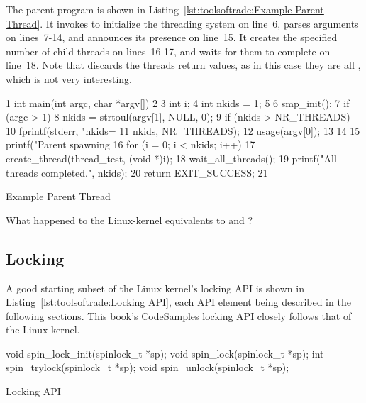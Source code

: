 The parent program is shown in
Listing~\ref{lst:toolsoftrade:Example Parent Thread}.
It invokes  to initialize the threading system on
line~6,
parses arguments on lines~7-14, and announces its presence on line~15.
It creates the specified number of child threads on lines~16-17,
and waits for them to complete on line~18.
Note that  discards the threads return values,
as in this case they are all , which is not very interesting.

\begin{listing}[tbp]
{ \scriptsize
\begin{verbbox}
  1 int main(int argc, char *argv[])
  2 {
  3   int i;
  4   int nkids = 1;
  5
  6   smp_init();
  7   if (argc > 1) {
  8     nkids = strtoul(argv[1], NULL, 0);
  9     if (nkids > NR_THREADS) {
 10       fprintf(stderr, "nkids=%
 11         nkids, NR_THREADS);
 12       usage(argv[0]);
 13     }
 14   }
 15   printf("Parent spawning %
 16   for (i = 0; i < nkids; i++)
 17     create_thread(thread_test, (void *)i);
 18   wait_all_threads();
 19   printf("All threads completed.\n", nkids);
 20   return EXIT_SUCCESS;
 21 }
\end{verbbox}
}
\centering
\theverbbox
\caption{Example Parent Thread}
\label{lst:toolsoftrade:Example Parent Thread}
\end{listing}

\QuickQuiz{}
	What happened to the Linux-kernel equivalents to 
	and ?
 \QuickQuizEnd

\subsection{Locking}
\label{sec:toolsoftrade:Locking}

A good starting subset of the Linux kernel's locking API is shown in
Listing~\ref{lst:toolsoftrade:Locking API},
each API element being described in the following sections.
This book's CodeSamples locking API closely follows that of the Linux kernel.

\begin{listing}[tbp]
{ \scriptsize
\begin{verbbox}
void spin_lock_init(spinlock_t *sp);
void spin_lock(spinlock_t *sp);
int spin_trylock(spinlock_t *sp);
void spin_unlock(spinlock_t *sp);
\end{verbbox}
}
\centering
\theverbbox
\caption{Locking API}
\label{lst:toolsoftrade:Locking API}
\end{listing}


